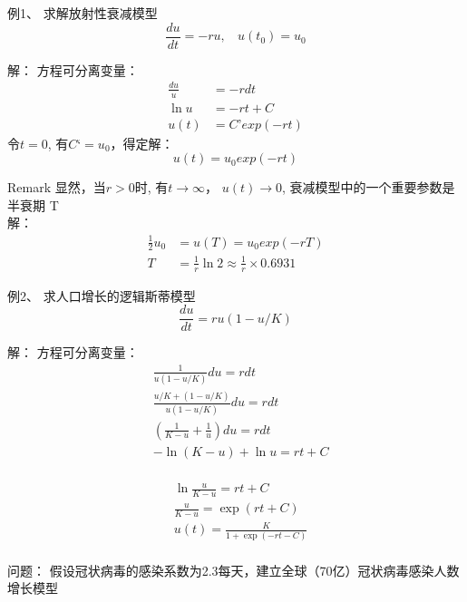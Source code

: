 \begin{frame}
	\begin{exampleblock} {例1、	求解放射性衰减模型}
	\begin{equation*}
	\frac{du}{dt}	= - ru, ~~~~ u(t_0) = u_0
	\end{equation*}
	\end{exampleblock} 	
	\alert{解：} 方程可分离变量：
	\begin{align*}
		\frac{du}{u} &= - rdt\\
		\ln u &=-rt+C\\
		u(t)&=C’exp(-rt)	
	\end{align*}
	令$t=0$, 有$C‘=u_0$，得定解：
	\begin{equation*}
		u(t)=u_0 exp(-rt)
	\end{equation*}
\end{frame}


\begin{frame}
\begin{block} {Remark}
	显然，当$r>0$时, 有$t \to \infty$， $u(t) \to 0$,  衰减模型中的一个重要参数是半衰期 T\\
	\alert{解：} 
	\begin{align*}
	\frac{1}{2}u_0 &=u(T) =u_0 exp(-rT)\\
	T &=\frac{1}{r} \ln 2  \approx \frac{1}{r} \times 0.6931	
	\end{align*}
	\end{block}
\end{frame}

\begin{frame}
	\begin{exampleblock} {例2、	求人口增长的逻辑斯蒂模型}
	\begin{equation*}
		\frac{d u}{d t}=r u (1-u/K)
	\end{equation*}
	\end{exampleblock} 	
	\alert{解：} 方程可分离变量：
	\begin{align*}
		&\frac{1}{u(1-u / K)}du =r d t \\
		&\frac{u / K+(1-u / K)}{u(1-u / K)} d u =r d t	\\
		&(\frac{1}{K-u}+\frac{1}{u} ) d u =r d t \\
		&-\ln (K-u)+\ln u =r t+C \\
	\end{align*}	
\end{frame}

\begin{frame}
	\begin{align*}
		&\ln \frac{u}{K-u}  = r t+C\\
		&\frac{u}{K-u} = \exp (r t+C)\\
		&u(t) = \frac{K}{1+ \exp (-r t-C)}	\\
	\end{align*}	
	\begin{block} {问题：}
	假设冠状病毒的感染系数为2.3每天，建立全球（70亿）冠状病毒感染人数增长模型
	\end{block}    
\end{frame}

